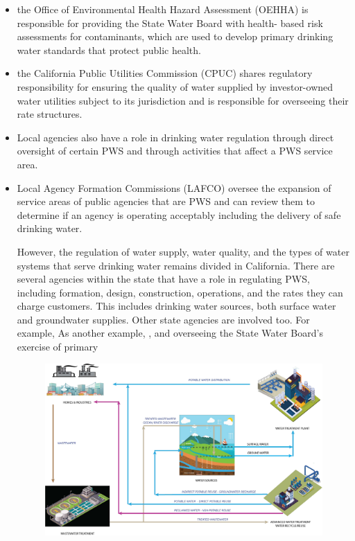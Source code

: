\begin{itemize}
\item the Office of Environmental Health Hazard Assessment (OEHHA) is responsible for providing the State Water Board with health- based risk assessments for contaminants, which are used to develop primary drinking water standards that protect public health.

\item the California Public Utilities Commission (CPUC) shares regulatory responsibility for ensuring the quality of water supplied by investor-owned water utilities subject to its jurisdiction and is responsible for overseeing their rate structures.


\item Local agencies also have a role in drinking water regulation through direct oversight of certain PWS and through activities that affect a PWS service area.


\item Local Agency Formation Commissions (LAFCO) oversee the expansion of service areas of public agencies that are PWS and can review them to determine if an agency is operating acceptably including the delivery of safe drinking water.

However, the regulation of water supply, water quality, and the types of water systems that serve drinking water remains divided in California. There are several agencies within the state that have a role in regulating PWS, including formation, design, construction, operations, and the rates they can charge customers.
 This includes drinking water sources, both surface water and groundwater supplies. Other state agencies are involved too. For example,  As another example, 
, and overseeing the State Water Board’s exercise of primary

\begin{figure}
\includegraphics[scale=0.2]{Test4}\\
\end{figure}



\end{itemize}
